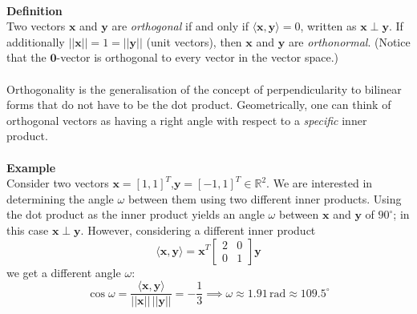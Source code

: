 \documentclass{report}
\begin{document}
\vspace{1mm}\\
\textbf{Definition}\\
Two vectors $\bm{x}$ and $\bm{y}$ are \textit{orthogonal} if and only if $\langle\bm{x},\bm{y}\rangle=0$,
written as $\bm{x}\perp\bm{y}$. If additionally $||\bm{x}||=1=||\bm{y}||$ (unit vectors), then
$\bm{x}$ and $\bm{y}$ are \textit{orthonormal}. (Notice that the $\bm{0}$-vector is orthogonal to every vector in
the vector space.)\\
\vspace{1mm}\\
Orthogonality is the generalisation of the concept of perpendicularity to bilinear forms that do
not have to be the dot product. Geometrically, one can think of orthogonal vectors as having a right
angle with respect to a \textit{specific} inner product.\\
\vspace{1mm}\\
\textbf{Example}\\
Consider two vectors $\bm{x}=[1,1]^T$,$\bm{y}=[-1,1]^T\in\mathbb{R}^2$. We are interested in determining the 
angle $\omega$ between them using two different inner products. Using the dot product as the
inner product yields an angle $\omega$ between $\bm{x}$ and $\bm{y}$ of $90^\circ$; in this case 
$\bm{x}\perp\bm{y}$. However, considering a different inner product
\begin{equation*}
\langle\bm{x},\bm{y}\rangle=\bm{x}^T\begin{bmatrix}
2&0\\0&1
\end{bmatrix}\bm{y}
\end{equation*}
we get a different angle $\omega$:
\begin{equation*}
\cos\omega=\frac{\langle\bm{x},\bm{y}\rangle}{||\bm{x}||\,||\bm{y}||}=-\frac{1}{3}\implies\omega\approx1.91\,
\text{rad}\approx109.5^\circ
\end{equation*}
\newpage
\end{document}
